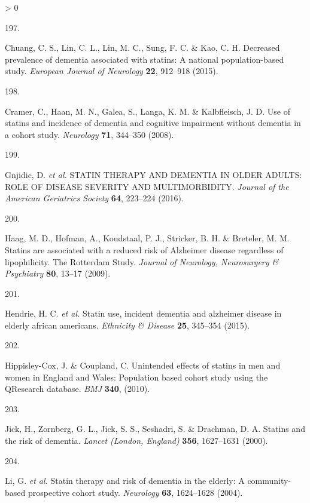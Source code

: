 \documentclass[a4paper, twoside]{templates/ociamthesis}
\newlength{\cslhangindent}
\newlength{\csllabelwidth}
\newenvironment{CSLReferences}[3] %
 {%
  \setlength{\parindent}{0pt}
  \ifodd #1 \everypar{\setlength{\hangindent}{\cslhangindent}}\ignorespaces\fi
  \ifnum #2 > 0
  \setlength{\parskip}{#2\baselineskip}
  \fi
 }%
 {}
\newcommand{\CSLLeftMargin}[1]{\parbox[t]{\maxof{\widthof{#1}}{\csllabelwidth}}{#1}}
\newcommand{\CSLRightInline}[1]{\parbox[t]{\linewidth - \csllabelwidth}{#1}}
\begin{document}
\begin{CSLReferences}{0}{0}
\leavevmode\hypertarget{ref-chuang2015}{}%
\CSLLeftMargin{197. }
\CSLRightInline{Chuang, C. S., Lin, C. L., Lin, M. C., Sung, F. C. \& Kao, C. H. Decreased prevalence of dementia associated with statins: A national population-based study. \emph{European Journal of Neurology} \textbf{22}, 912--918 (2015).}

\leavevmode\hypertarget{ref-cramer2008}{}%
\CSLLeftMargin{198. }
\CSLRightInline{Cramer, C., Haan, M. N., Galea, S., Langa, K. M. \& Kalbfleisch, J. D. Use of statins and incidence of dementia and cognitive impairment without dementia in a cohort study. \emph{Neurology} \textbf{71}, 344--350 (2008).}

\leavevmode\hypertarget{ref-gnjidic2016}{}%
\CSLLeftMargin{199. }
\CSLRightInline{Gnjidic, D. \emph{et al.} {STATIN THERAPY AND DEMENTIA IN OLDER ADULTS}: {ROLE OF DISEASE SEVERITY AND MULTIMORBIDITY}. \emph{Journal of the American Geriatrics Society} \textbf{64}, 223--224 (2016).}

\leavevmode\hypertarget{ref-haag2009}{}%
\CSLLeftMargin{200. }
\CSLRightInline{Haag, M. D., Hofman, A., Koudstaal, P. J., Stricker, B. H. \& Breteler, M. M. Statins are associated with a reduced risk of {Alzheimer} disease regardless of lipophilicity. {The Rotterdam Study}. \emph{Journal of Neurology, Neurosurgery \& Psychiatry} \textbf{80}, 13--17 (2009).}

\leavevmode\hypertarget{ref-hendrie2015}{}%
\CSLLeftMargin{201. }
\CSLRightInline{Hendrie, H. C. \emph{et al.} Statin use, incident dementia and alzheimer disease in elderly african americans. \emph{Ethnicity \& Disease} \textbf{25}, 345--354 (2015).}

\leavevmode\hypertarget{ref-hippisley-cox2010}{}%
\CSLLeftMargin{202. }
\CSLRightInline{Hippisley-Cox, J. \& Coupland, C. Unintended effects of statins in men and women in {England} and {Wales}: Population based cohort study using the {QResearch} database. \emph{BMJ} \textbf{340}, (2010).}

\leavevmode\hypertarget{ref-jick2000}{}%
\CSLLeftMargin{203. }
\CSLRightInline{Jick, H., Zornberg, G. L., Jick, S. S., Seshadri, S. \& Drachman, D. A. Statins and the risk of dementia. \emph{Lancet (London, England)} \textbf{356}, 1627--1631 (2000).}

\leavevmode\hypertarget{ref-li2004}{}%
\CSLLeftMargin{204. }
\CSLRightInline{Li, G. \emph{et al.} Statin therapy and risk of dementia in the elderly: A community-based prospective cohort study. \emph{Neurology} \textbf{63}, 1624--1628 (2004).}


\end{CSLReferences}
\end{document}
